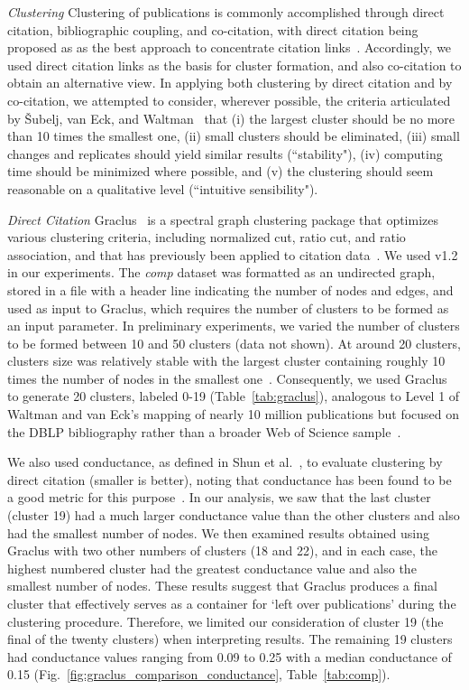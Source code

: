 \emph{Clustering} Clustering of publications is commonly accomplished through direct citation, bibliographic coupling, and co-citation, with direct citation being proposed as as the best approach to concentrate citation links~\cite{klavans_which_2017}. Accordingly, we used direct citation links as the basis for cluster formation, and also co-citation to obtain an alternative view. In applying both clustering by direct citation and by co-citation, we attempted to consider, wherever possible, the criteria articulated by \v{S}ubelj, van Eck, and Waltman~\cite{subelj_clustering_2016} that (i) the largest cluster should be no more than 10 times the smallest one, (ii) small clusters should be eliminated, (iii) small changes and replicates should yield similar results (``stability"),  (iv) computing time should be minimized where possible, and (v) the clustering should seem reasonable on a qualitative level (``intuitive sensibility").

 \emph {Direct Citation} Graclus~\cite{graclus_2007} is a spectral graph clustering package that optimizes  various clustering criteria, including normalized cut, ratio cut, and ratio association, and that has previously been applied to citation data~\cite{subelj_clustering_2016}. 
We used v1.2 in our experiments. The \emph{comp} dataset was formatted as an undirected graph, stored in a file with a header line indicating the number of nodes and edges, and used as input to Graclus, which requires the number of clusters to be formed as an input parameter. In preliminary experiments, we varied the number of clusters to be formed between 10 and 50 clusters (data not shown).  At around 20 clusters, clusters size was relatively stable with the largest cluster containing roughly 10 times the number of nodes in the smallest one~\cite{subelj_clustering_2016}. Consequently, we used Graclus to generate 20 clusters, labeled 0-19 (Table~\ref{tab:graclus}), analogous to Level 1 of Waltman and van Eck's mapping of nearly 10 million publications but focused on the DBLP bibliography rather than a broader Web of Science sample~\cite{waltman_new_2012}. 

We also used conductance, as defined in Shun et al.~\cite{shun_parallel_2016}, to  evaluate clustering by direct citation (smaller is better), noting that conductance has been found to be a good metric for this purpose~\cite{emmons2016analysis,almeida_2012}. In our analysis, we saw that the last cluster (cluster 19) had a much larger conductance value than the other clusters and also had the smallest number of nodes. We then examined results obtained using Graclus with two other numbers of clusters (18 and 22), and in each case, the highest numbered cluster had the greatest conductance value and also the smallest number of nodes. These results suggest that Graclus produces a final cluster that effectively serves as a container for `left over publications' during the clustering procedure. Therefore, we limited our consideration of cluster 19 (the final of the twenty clusters)  when interpreting results.  The remaining 19 clusters had conductance values ranging from 0.09 to 0.25 with a median conductance of 0.15 (Fig.~\ref{fig:graclus_comparison_conductance}, Table~\ref{tab:comp}).

